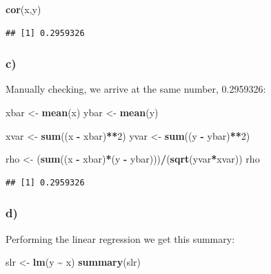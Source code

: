\documentclass[
]{article}
\newenvironment{Shaded}{\begin{snugshade}}{\end{snugshade}}
\newcommand{\DecValTok}[1]{\textcolor[rgb]{0.00,0.00,0.81}{#1}}
\newcommand{\FunctionTok}[1]{\textcolor[rgb]{0.13,0.29,0.53}{\textbf{#1}}}
\newcommand{\NormalTok}[1]{#1}
\newcommand{\OtherTok}[1]{\textcolor[rgb]{0.56,0.35,0.01}{#1}}
\newcommand{\SpecialCharTok}[1]{\textcolor[rgb]{0.81,0.36,0.00}{\textbf{#1}}}
\begin{document}
\begin{Shaded}
\begin{Highlighting}[]
\FunctionTok{cor}\NormalTok{(x,y)}
\end{Highlighting}
\end{Shaded}

\begin{verbatim}
## [1] 0.2959326
\end{verbatim}

\subsubsection{c)}\label{c}

Manually checking, we arrive at the same number, 0.2959326:

\begin{Shaded}
\begin{Highlighting}[]
\NormalTok{xbar }\OtherTok{\textless{}{-}} \FunctionTok{mean}\NormalTok{(x)}
\NormalTok{ybar }\OtherTok{\textless{}{-}} \FunctionTok{mean}\NormalTok{(y)}

\NormalTok{xvar }\OtherTok{\textless{}{-}} \FunctionTok{sum}\NormalTok{((x }\SpecialCharTok{{-}}\NormalTok{ xbar)}\SpecialCharTok{**}\DecValTok{2}\NormalTok{)}
\NormalTok{yvar }\OtherTok{\textless{}{-}} \FunctionTok{sum}\NormalTok{((y }\SpecialCharTok{{-}}\NormalTok{ ybar)}\SpecialCharTok{**}\DecValTok{2}\NormalTok{)}

\NormalTok{rho }\OtherTok{\textless{}{-}}\NormalTok{ (}\FunctionTok{sum}\NormalTok{((x }\SpecialCharTok{{-}}\NormalTok{ xbar)}\SpecialCharTok{*}\NormalTok{(y }\SpecialCharTok{{-}}\NormalTok{ ybar)))}\SpecialCharTok{/}\NormalTok{(}\FunctionTok{sqrt}\NormalTok{(yvar}\SpecialCharTok{*}\NormalTok{xvar))}
\NormalTok{rho}
\end{Highlighting}
\end{Shaded}

\begin{verbatim}
## [1] 0.2959326
\end{verbatim}

\subsubsection{d)}\label{d}

Performing the linear regression we get this summary:

\begin{Shaded}
\begin{Highlighting}[]
\NormalTok{slr }\OtherTok{\textless{}{-}} \FunctionTok{lm}\NormalTok{(y }\SpecialCharTok{\textasciitilde{}}\NormalTok{ x)}
\FunctionTok{summary}\NormalTok{(slr)}
\end{Highlighting}
\end{Shaded}
\end{document}
